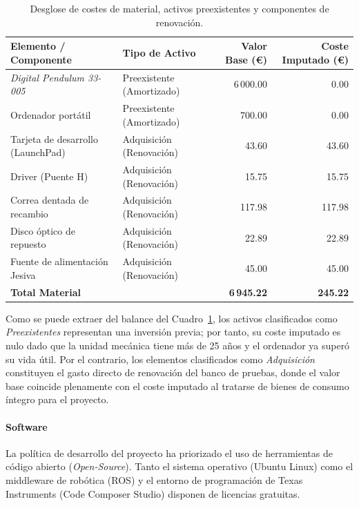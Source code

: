 \documentclass[11pt,fleqn]{book} %
\begin{document}
\begin{table}[!htbp]
	\centering
	\caption{Desglose de costes de material, activos preexistentes y componentes de renovación.}
	\label{tab:coste_material}
	\small
	\begin{tabularx}{\textwidth}{@{} X l r r @{}}
		\toprule
		\textbf{Elemento / Componente} & \textbf{Tipo de Activo} & \textbf{Valor Base (\euro)} & \textbf{Coste Imputado (\euro)} \\ 
		\midrule
		\textit{Digital Pendulum 33-005} & Preexistente (Amortizado) & 6\,000.00 & 0.00 \\
		Ordenador portátil               & Preexistente (Amortizado) & 700.00    & 0.00 \\
		Tarjeta de desarrollo (LaunchPad) & Adquisición (Renovación)   & 43.60     & 43.60 \\
		Driver (Puente H)                & Adquisición (Renovación)   & 15.75     & 15.75 \\
		Correa dentada de recambio       & Adquisición (Renovación)   & 117.98    & 117.98 \\
		Disco óptico de repuesto         & Adquisición (Renovación)   & 22.89     & 22.89 \\
		Fuente de alimentación Jesiva    & Adquisición (Renovación)   & 45.00     & 45.00 \\ 
		\midrule
		\textbf{Total Material}          &                            & \textbf{6\,945.22} & \textbf{245.22} \\ 
		\bottomrule
	\end{tabularx}
\end{table}
\FloatBarrier

Como se puede extraer del balance del Cuadro~\ref{tab:coste_material}, los activos clasificados como \textit{Preexistentes} representan una inversión previa; por tanto, su coste imputado es nulo dado que la unidad mecánica tiene más de 25 años y el ordenador ya superó su vida útil. Por el contrario, los elementos clasificados como \textit{Adquisición} constituyen el gasto directo de renovación del banco de pruebas, donde el valor base coincide plenamente con el coste imputado al tratarse de bienes de consumo íntegro para el proyecto.

\newpage
\paragraph{Software}
La política de desarrollo del proyecto ha priorizado el uso de herramientas de código abierto (\textit{Open-Source}). Tanto el sistema operativo (Ubuntu Linux) como el middleware de robótica (ROS) y el entorno de programación de Texas Instruments (Code Composer Studio) disponen de licencias gratuitas.
\end{document}
